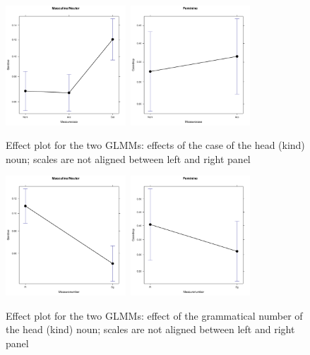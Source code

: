 \documentclass[USenglish]{article}
\begin{document}
\begin{figure}[h]
\centering
\includegraphics[width=0.4\textwidth]{figures/corpus/04_glmm_fixeff_mn_Measurecase}~\includegraphics[width=0.4\textwidth]{figures/corpus/04_glmm_fixeff_fem_Measurecase}
\caption{Effect plot for the two GLMMs: effects of the case of the head (kind) noun; scales are not aligned between left and right panel}
\label{fig:glmm:fixef:measureclass}
\end{figure}

\begin{figure}[h]
\centering
\includegraphics[width=0.4\textwidth]{figures/corpus/04_glmm_fixeff_mn_Measurenumber}~\includegraphics[width=0.4\textwidth]{figures/corpus/04_glmm_fixeff_fem_Measurenumber}
\caption{Effect plot for the two GLMMs: effect of the grammatical number of the head (kind) noun; scales are not aligned between left and right panel}
\label{fig:glmm:fixef:measurenumber}
\end{figure}
\end{document}
